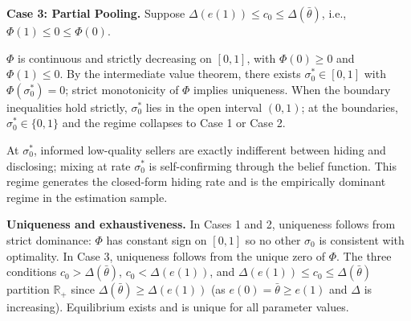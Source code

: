\medskip
\textbf{Case 3: Partial Pooling.} Suppose $\Delta(e(1)) \leq c_0 \leq \Delta(\bar{\theta})$, i.e., $\Phi(1) \leq 0 \leq \Phi(0)$.

$\Phi$ is continuous and strictly decreasing on $[0,1]$, with $\Phi(0) \geq 0$ and $\Phi(1) \leq 0$. By the intermediate value theorem, there exists $\sigma_0^* \in [0,1]$ with $\Phi(\sigma_0^*) = 0$; strict monotonicity of $\Phi$ implies uniqueness. When the boundary inequalities hold strictly, $\sigma_0^*$ lies in the open interval $(0,1)$; at the boundaries, $\sigma_0^* \in \{0,1\}$ and the regime collapses to Case 1 or Case 2.

At $\sigma_0^*$, informed low-quality sellers are exactly indifferent between hiding and disclosing; mixing at rate $\sigma_0^*$ is self-confirming through the belief function. This regime generates the closed-form hiding rate and is the empirically dominant regime in the estimation sample.

\medskip
\textbf{Uniqueness and exhaustiveness.} In Cases 1 and 2, uniqueness follows from strict dominance: $\Phi$ has constant sign on $[0,1]$ so no other $\sigma_0$ is consistent with optimality. In Case 3, uniqueness follows from the unique zero of $\Phi$. The three conditions $c_0 > \Delta(\bar{\theta})$, $c_0 < \Delta(e(1))$, and $\Delta(e(1)) \leq c_0 \leq \Delta(\bar{\theta})$ partition $\mathbb{R}_{+}$ since $\Delta(\bar{\theta}) \geq \Delta(e(1))$ (as $e(0) = \bar{\theta} \geq e(1)$ and $\Delta$ is increasing). Equilibrium exists and is unique for all parameter values.
